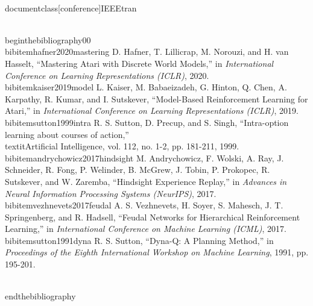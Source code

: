 \\documentclass[conference]{IEEEtran}
\begin{document}
\\begin{thebibliography}{00}
\\bibitem{hafner2020mastering}
D. Hafner, T. Lillicrap, M. Norouzi, and H. van Hasselt, ``Mastering Atari with Discrete World Models,''
    in \textit{International Conference on Learning Representations (ICLR)}, 2020.
\\bibitem{kaiser2019model}
L. Kaiser, M. Babaeizadeh, G. Hinton, Q. Chen, A. Karpathy, R. Kumar, and I. Sutskever, ``Model-Based Reinforcement Learning for Atari,''
    in \textit{International Conference on Learning Representations (ICLR)}, 2019.
\\bibitem{sutton1999intra}
R. S. Sutton, D. Precup, and S. Singh, ``Intra-option learning about courses of action,''
    \\textit{Artificial Intelligence}, vol. 112, no. 1-2, pp. 181-211, 1999.
\\bibitem{andrychowicz2017hindsight}
M. Andrychowicz, F. Wolski, A. Ray, J. Schneider, R. Fong, P. Welinder, B. McGrew, J. Tobin, P. Prokopec, R. Sutskever, and W. Zaremba, ``Hindsight Experience Replay,''
    in \textit{Advances in Neural Information Processing Systems (NeurIPS)}, 2017.
\\bibitem{vezhnevets2017feudal}
A. S. Vezhnevets, H. Soyer, S. Mahesch, J. T. Springenberg, and R. Hadsell, ``Feudal Networks for Hierarchical Reinforcement Learning,''
    in \textit{International Conference on Machine Learning (ICML)}, 2017.
\\bibitem{sutton1991dyna}
R. S. Sutton, ``Dyna-Q: A Planning Method,''
    in \textit{Proceedings of the Eighth International Workshop on Machine Learning}, 1991, pp. 195-201.

\\end{thebibliography}



\
\end{document}
